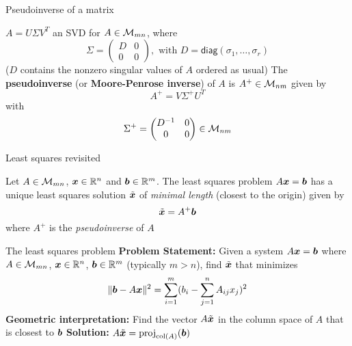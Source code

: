\documentclass[aspectratio=169]{beamer}\usepackage[]{graphicx}\usepackage[]{xcolor}
\begin{document}
\begin{frame}{Pseudoinverse of a matrix}
\begin{definition}[Pseudoinverse]
$A=U\Sigma V^T$ an SVD for $A\in\mathcal{M}_{mn}$, where 
\[
\Sigma = \begin{pmatrix}
D & 0 \\ 0 & 0
\end{pmatrix},
\textrm{ with }
D=\mathsf{diag}(\sigma_1,\ldots,\sigma_r)
\]
($D$ contains the nonzero singular values of $A$ ordered as usual)
\vskip0.5cm
The \textbf{pseudoinverse} (or \textbf{Moore-Penrose inverse}) of $A$ is $A^+\in\mathcal{M}_{nm}$ given by
\[
A^+ = V\Sigma^+ U^T
\]
with
\[
\Sigma^+ =
\begin{pmatrix}
D^{-1} & 0 \\ 0 & 0
\end{pmatrix}\in\mathcal{M}_{nm}
\]
\end{definition}
\end{frame}



\begin{frame}{Least squares revisited}
\begin{importanttheorem}
Let $A\in\mathcal{M}_{mn}$, $\bm{x}\in\mathbb{R}^n$ and $\bm{b}\in\mathbb{R}^m$. The least squares problem $A\bm{x}=\bm{b}$ has a unique least squares solution $\tilde{\bm{x}}$ of \emph{minimal length} (closest to the origin) given by
\[
\tilde{\bm{x}} = A^+\bm{b}
\]
where $A^+$ is the \emph{pseudoinverse} of $A$
\end{importanttheorem}
\end{frame}





\begin{frame}{The least squares problem}
\textbf{Problem Statement:}
\vfill
Given a system $A\bm{x} = \bm{b}$ where $A\in\mathcal{M}_{mn}$, $\bm{x}\in\mathbb{R}^n$, $\bm{b}\in\mathbb{R}^m$ (typically $m>n$), find $\tilde{\bm{x}}$ that minimizes
$$
\|\bm{b} - A\bm{x}\|^2 = \sum_{i=1}^m (b_i - \sum_{j=1}^n A_{ij}x_j)^2
$$
\vfill
\textbf{Geometric interpretation:}
Find the vector $A\tilde{\bm{x}}$ in the column space of $A$ that is closest to $\bm{b}$
\vfill
\textbf{Solution:} $A\tilde{\bm{x}} = \text{proj}_{\text{col}(A)}(\bm{b})$
\end{frame}
\end{document}
